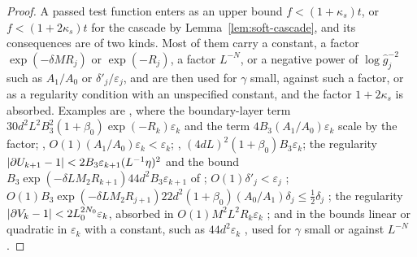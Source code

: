 \documentclass[11pt]{preprint}
\DeclarePairedDelimiter{\abs}{\lvert}{\rvert}
\numberwithin{equation}{section}
\theoremstyle{definition}
\theoremstyle{remark}
\theoremstyle{plain}
\begin{document}
\begin{proof}
A passed test function enters as an upper bound $f < (1 + \kappa_s)t$, or $f < (1 + 2\kappa_s)t$ for the cascade by Lemma~\ref{lem:soft-cascade}, and its consequences are of two kinds. Most of them carry a constant, a factor $\exp(-\delta MR_j)$ or $\exp(-R_j)$, a factor $L^{-N}$, or a negative power of $\log\hat g_j^{-2}$ such as $A_1/A_0$ or $\delta'_j/\varepsilon_j$, and are then used for $\gamma$ small, against such a factor, or as a regularity condition with an unspecified constant, and the factor $1 + 2\kappa_s$ is absorbed. Examples are \cite[(3.7), p.~266]{BalabanCRE}, where the boundary-layer term $30d^2L^2B_3^2(1 + \beta_0)\exp(-R_k)\varepsilon_k$ and the term $4B_3(A_1/A_0)\varepsilon_k$ scale by the factor; \cite[(3.9), p.~266]{BalabanCRE}, $O(1)(A_1/A_0)\varepsilon_k < \varepsilon_k$; \cite[(3.13), p.~267]{BalabanCRE}, $(4dL)^2(1 + \beta_0)B_3\varepsilon_k$; the regularity $\abs{\partial U_{k+1} - 1} < 2B_3\varepsilon_{k+1}(L^{-1}\eta)^2$ and the bound $B_3\exp(-\delta LM_2R_{k+1})44d^2B_3\varepsilon_{k+1}$ of \cite[p.~268]{BalabanCRE}; $O(1)\delta'_j < \varepsilon_j$ \cite[p.~184]{BalabanLFR1}; $O(1)B_3\exp(-\delta LM_2R_{j+1})22d^2(1 + \beta_0)(A_0/A_1)\delta_j \leq \frac12\delta_j$ \cite[p.~185]{BalabanLFR1}; the regularity $\abs{\partial V_k - 1} < 2L_0^{2N_0}\varepsilon_k$, absorbed in $O(1)M^2L^2R_k\varepsilon_k$ \cite[p.~193]{BalabanLFR1}; and in \cite[pp.~356--377]{BalabanLFR2} the bounds linear or quadratic in $\varepsilon_k$ with a constant, such as $44d^2\varepsilon_k$ \cite[p.~365]{BalabanLFR2}, used for $\gamma$ small or against $L^{-N}$ \cite[p.~363]{BalabanLFR2}.


\end{proof}
\end{document}
